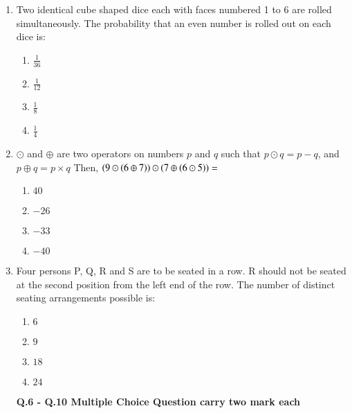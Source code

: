\documentclass[journal,12pt,onecolumn]{article}
\theoremstyle{remark}
\begin{document}
\begin{enumerate}
\item Two identical cube shaped dice each with faces numbered 1 to 6 are rolled simultaneously. The probability that an even number is rolled out on each dice is:

\hfill{}
\begin{multicols}{4}
\begin{enumerate}
    \item $\frac{1}{36}$
    \item $\frac{1}{12}$
    \item $\frac{1}{8}$
    \item $\frac{1}{4}$
\end{enumerate}
\end{multicols}

\item $\odot$ and $\oplus$ are two operators on numbers $p$ and $q$ such that
$p \odot q = p - q$, and $p \oplus q = p \times q$
Then, $\left(9 \odot \left(6 \oplus 7\right)\right) \odot \left(7 \oplus \left(6 \odot 5\right)\right) = $

\hfill{}

\begin{multicols}{2}
\begin{enumerate}
    \item $40$
    \item $-26$
    \item $-33$
    \item $-40$
\end{enumerate}
\end{multicols}

\item Four persons P, Q, R and S are to be seated in a row. R should not be seated at the second position from the left end of the row. The number of distinct seating arrangements possible is:

\hfill{}

\begin{multicols}{2}
\begin{enumerate}
    \item $6$
    \item $9$
    \item $18$
    \item $24$
\end{enumerate}
\end{multicols}

\textbf{Q.6 - Q.10 Multiple Choice Question carry two mark each}


\end{enumerate}
\end{document}
